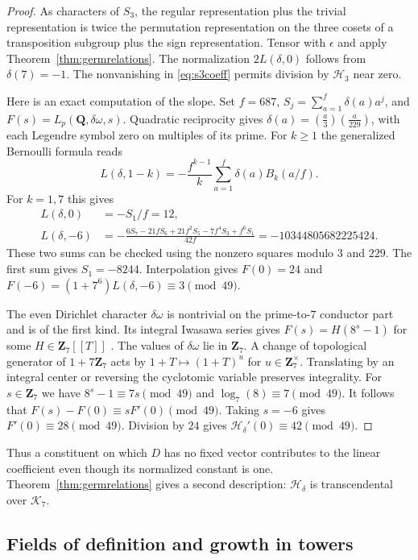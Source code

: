 \documentclass[11pt]{amsart}
\numberwithin{equation}{section}
\theoremstyle{definition}
\theoremstyle{remark}
\newcommand{\Q}{\mathbf Q}
\newcommand{\Z}{\mathbf Z}
\begin{document}
\begin{proof}
As characters of $S_3$, the regular representation plus the trivial
representation is twice the permutation representation on the three
cosets of a transposition subgroup plus the sign representation.
Tensor with $\epsilon$ and apply Theorem~\ref{thm:germrelations}.
The normalization $2L(\delta,0)$ follows from $\delta(7)=-1$.
The nonvanishing in \eqref{eq:s3coeff} permits division by
$\mathcal H_3$ near zero.

Here is an exact computation of the slope. Set $f=687$,
$S_j=\sum_{a=1}^f\delta(a)a^j$, and $F(s)=L_p(\Q,\delta\omega,s)$.
Quadratic reciprocity gives
$\delta(a)=(\frac a3)(\frac a{229})$, with each Legendre symbol
zero on multiples of its prime. For $k\ge1$ the generalized
Bernoulli formula \cite[Ch.~4]{Washington} reads
\[
 L(\delta,1-k)=-\frac{f^{k-1}}{k}\sum_{a=1}^f\delta(a)B_k(a/f).
\]
For $k=1,7$ this gives
\begin{align*}
 L(\delta,0)&=-S_1/f=12,\\
 L(\delta,-6)&=-\frac{6S_7-21fS_6+21f^2S_5-7f^4S_3+f^6S_1}{42f}
                  =-10344805682225424 .
\end{align*}
These two sums can be checked using the nonzero squares modulo
$3$ and $229$. The first sum gives $S_1=-8244$.
Interpolation gives $F(0)=24$ and
$F(-6)=(1+7^6)L(\delta,-6)\equiv3\pmod{49}$.

The even Dirichlet character $\delta\omega$ is nontrivial on the
prime-to-$7$ conductor part and is of the first kind. Its integral
Iwasawa series gives $F(s)=H(8^s-1)$ for some $H\in\Z_7[[T]]$
\cite[Th.~7.10]{Washington}. The values of $\delta\omega$ lie in
$\Z_7$. A change of topological generator of $1+7\Z_7$ acts by
$1+T\mapsto(1+T)^u$ for $u\in\Z_7^\times$. Translating by an
integral center or reversing the cyclotomic variable preserves
integrality. For $s\in\Z_7$
we have $8^s-1\equiv 7s\pmod{49}$ and
$\log_7(8)\equiv7\pmod{49}$. It follows that
$F(s)-F(0)\equiv sF'(0)\pmod{49}$. Taking $s=-6$ gives
$F'(0)\equiv28\pmod{49}$. Division by $24$ gives
$\mathcal H_\delta'(0)\equiv42\pmod{49}$.
\end{proof}

Thus a constituent on which $D$ has no fixed vector contributes
to the linear coefficient even though its normalized constant is
one. Theorem~\ref{thm:germrelations} gives a second description:
$\mathcal H_\delta$ is transcendental over $\mathcal K_7$.

\subsection{Fields of definition and growth in towers}
\end{document}
